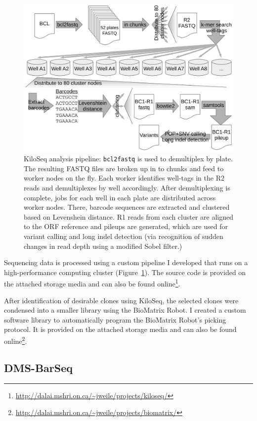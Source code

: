 \begin{figure}[h!]
	\centering
	\includegraphics[width=.6\textwidth]{img/kiloseq_pipeline.pdf}
	\caption{KiloSeq analysis pipeline: \texttt{bcl2fastq} is used to demultiplex by plate. The resulting FASTQ files are broken up in to chunks and feed to worker nodes on the fly. Each worker identifies well-tags in the R2 reads and demultiplexes by well accordingly. After demultiplexing is complete, jobs for each well in each plate are distributed across worker nodes. There, barcode sequences are extracted and clustered based on Levenshein distance. R1 reads from each cluster are aligned to the ORF reference and pileups are generated, which are used for variant calling and long indel detection (via recognition of sudden changes in read depth using a modified Sobel filter.)}
	\label{fig:kiloseqPipeline}
\end{figure}


Sequencing data is processed using a custom pipeline I developed that runs on a high-performance computing cluster (Figure~\ref{fig:kiloseqPipeline}). The source code is provided on the attached storage media and can also be found online\footnote{\url{http://dalai.mshri.on.ca/~jweile/projects/kiloseq/}}.

After identification of desirable clones using KiloSeq, the selected clones were condensed into a smaller library using the BioMatrix Robot. I created a custom software library to automatically program the BioMatrix Robot's picking protocol. It is provided on the attached storage media and can also be found online\footnote{\url{http://dalai.mshri.on.ca/~jweile/projects/biomatrix/}}.

\subsection{DMS-BarSeq}

